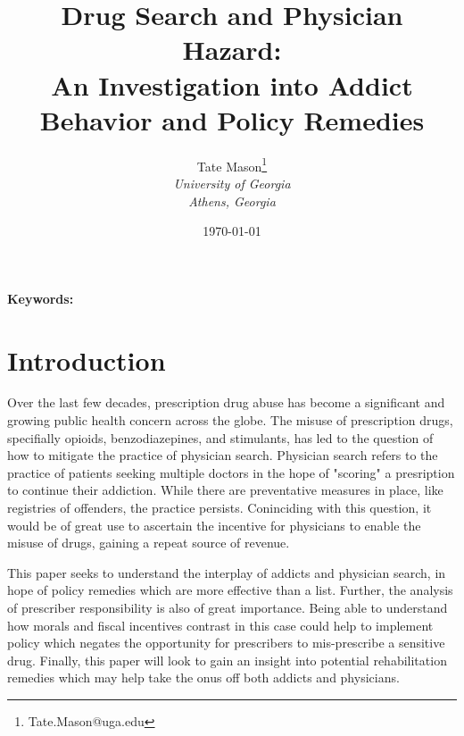 \documentclass[11pt,a4paper]{article}
\title{Drug Search and Physician Hazard: \\
An Investigation into Addict Behavior and Policy Remedies}
\author{
    Tate Mason\thanks{Tate.Mason@uga.edu} \\
    \textit{University of Georgia} \\
    \textit{Athens, Georgia} \\
}
\date{\today}
\newenvironment{abstract}%
{\cleardoublepage\null \vfill\begin{center}%
\bfseries \abstractname \end{center}}%
{\vfill\null}
\begin{document}
\maketitle
\thispagestyle{empty}

\begin{abstract}
\noindent %

\vspace{0.3cm}
\noindent \textbf{Keywords:} %
\end{abstract}

\newpage
\setcounter{page}{1}

\section{Introduction}
\label{sec:introduction}

Over the last few decades, prescription drug abuse has become a significant and growing public health concern across the globe. The misuse of prescription drugs, specifially opioids, benzodiazepines, and stimulants, has led to the question of how to mitigate the practice of
physician search. Physician search refers to the practice of patients seeking multiple doctors in the hope of "scoring" a presription to continue their addiction. While there are preventative measures in place, like registries of offenders, the practice persists. Coninciding
with this question, it would be of great use to ascertain the incentive for physicians to enable the misuse of drugs, gaining a repeat source of revenue.

This paper seeks to understand the interplay of addicts and physician search, in hope of policy remedies which are more effective than a list. Further, the analysis of prescriber responsibility is also of great importance. Being able to understand how morals and fiscal
incentives contrast in this case could help to implement policy which negates the opportunity for prescribers to mis-prescribe a sensitive drug. Finally, this paper will look to gain an insight into potential rehabilitation remedies which may help take the onus off both
addicts and physicians.

\end{document}
